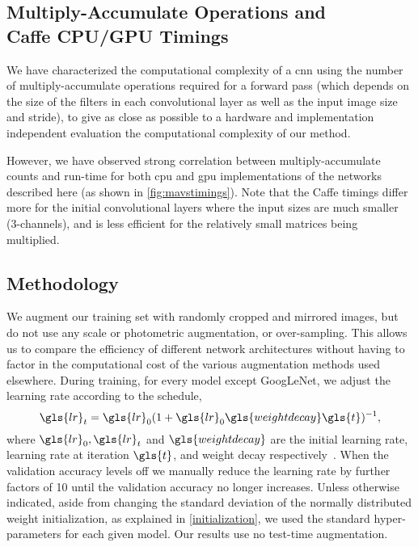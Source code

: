 \documentclass[thesis]{subfiles}
\begin{document}
    \subsection[Multiply-Accumulate Operations and Caffe CPU/GPU Timings]{Multiply-Accumulate Operations and\\Caffe CPU/GPU Timings}\label{mavstimings}
    We have characterized the computational complexity of a \gls{cnn} using the number of multiply-accumulate operations required for a forward pass (which depends on the size of the filters in each convolutional layer as well as the input image size and stride), to give as close as possible to a hardware and implementation independent evaluation the computational complexity of our method.
    
    However, we have observed strong correlation between multiply-accumulate counts and run-time for both \gls{cpu} and \gls{gpu} implementations of the networks described here (as shown in \cref{fig:mavstimings}). Note that the Caffe timings differ more for the initial convolutional layers where the input sizes are much smaller (3-channels), and  is less efficient for the relatively small matrices being multiplied.
    
    \subsection{Methodology}
    We augment our training set with randomly cropped and mirrored images, but do not use any scale or photometric augmentation, or over-sampling. This allows us to compare the efficiency of different network architectures without having to factor in the computational cost of the various augmentation methods used elsewhere. During training, for every model except GoogLeNet, we adjust the learning rate according to the schedule,
    \begin{equation}
        \gls{lr}_t = \gls{lr}_0(1+\gls{lr}_0\gls{weightdecay} \gls{t})^{-1},
    \end{equation}
    where $\gls{lr}_0,\gls{lr}_t$ and $\gls{weightdecay}$ are the initial learning rate, learning rate at iteration $\gls{t}$, and weight decay respectively~\citep{Bottou2012sgdtricks}. When the validation accuracy levels off we manually reduce the learning rate by further factors of 10 until the validation accuracy no longer increases. Unless otherwise indicated, aside from changing the standard deviation of the normally distributed weight initialization, as explained in \cref{initialization}, we used the standard hyper-parameters for each given model. Our results use no test-time augmentation.  
    
\end{document}
